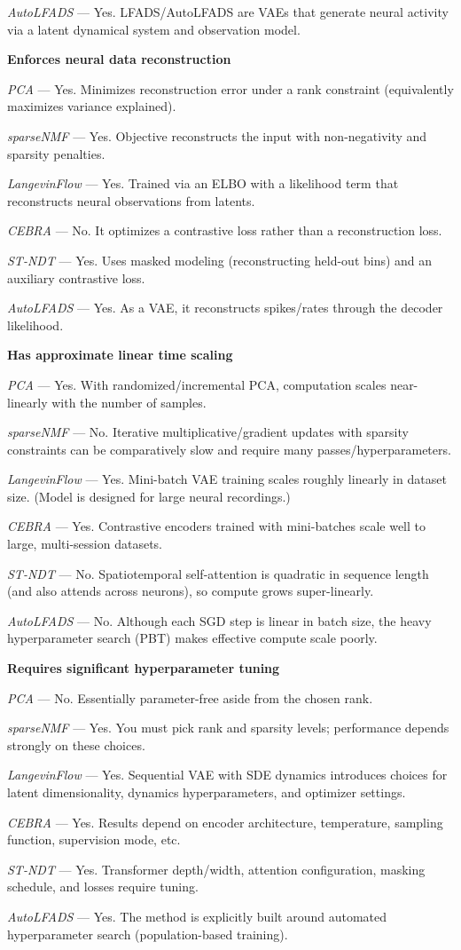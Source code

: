 \textit{AutoLFADS} — Yes. LFADS/AutoLFADS are VAEs that generate neural activity via a latent dynamical system and observation model.

\textbf{Enforces neural data reconstruction}

\textit{PCA} — Yes. Minimizes reconstruction error under a rank constraint (equivalently maximizes variance explained).

\textit{sparseNMF} — Yes. Objective reconstructs the input with non-negativity and sparsity penalties.

\textit{LangevinFlow} — Yes. Trained via an ELBO with a likelihood term that reconstructs neural observations from latents.

\textit{CEBRA} — No. It optimizes a contrastive loss rather than a reconstruction loss.

\textit{ST-NDT} — Yes. Uses masked modeling (reconstructing held-out bins) and an auxiliary contrastive loss.

\textit{AutoLFADS} — Yes. As a VAE, it reconstructs spikes/rates through the decoder likelihood.

\textbf{Has approximate linear time scaling}

\textit{PCA} — Yes. With randomized/incremental PCA, computation scales near-linearly with the number of samples.

\textit{sparseNMF} — No. Iterative multiplicative/gradient updates with sparsity constraints can be comparatively slow and require many passes/hyperparameters.

\textit{LangevinFlow} — Yes. Mini-batch VAE training scales roughly linearly in dataset size. (Model is designed for large neural recordings.)

\textit{CEBRA} — Yes. Contrastive encoders trained with mini-batches scale well to large, multi-session datasets.

\textit{ST-NDT} — No. Spatiotemporal self-attention is quadratic in sequence length (and also attends across neurons), so compute grows super-linearly.

\textit{AutoLFADS} — No. Although each SGD step is linear in batch size, the heavy hyperparameter search (PBT) makes effective compute scale poorly.

\textbf{Requires significant hyperparameter tuning}

\textit{PCA} — No. Essentially parameter-free aside from the chosen rank.

\textit{sparseNMF} — Yes. You must pick rank and sparsity levels; performance depends strongly on these choices.

\textit{LangevinFlow} — Yes. Sequential VAE with SDE dynamics introduces choices for latent dimensionality, dynamics hyperparameters, and optimizer settings.

\textit{CEBRA} — Yes. Results depend on encoder architecture, temperature, sampling function, supervision mode, etc.

\textit{ST-NDT} — Yes. Transformer depth/width, attention configuration, masking schedule, and losses require tuning.

\textit{AutoLFADS} — Yes. The method is explicitly built around automated hyperparameter search (population-based training).
